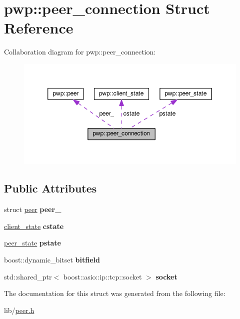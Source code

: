 \hypertarget{structpwp_1_1peer__connection}{}\section{pwp\+:\+:peer\+\_\+connection Struct Reference}
\label{structpwp_1_1peer__connection}


Collaboration diagram for pwp\+:\+:peer\+\_\+connection\+:\nopagebreak
\begin{figure}[H]
\begin{center}
\leavevmode
\includegraphics[width=350pt]{structpwp_1_1peer__connection__coll__graph}
\end{center}
\end{figure}
\subsection*{Public Attributes}
\begin{DoxyCompactItemize}
\item 
\mbox{\label{structpwp_1_1peer__connection_a467a52a32ff0250d977b69026edce52c}} 
struct \hyperlink{structpwp_1_1peer}{peer} {\bfseries peer\+\_\+}
\item 
\mbox{\label{structpwp_1_1peer__connection_a7760fde637e5b09ba43010b8e5b4cdf0}} 
\hyperlink{structpwp_1_1client__state}{client\+\_\+state} {\bfseries cstate}
\item 
\mbox{\label{structpwp_1_1peer__connection_a6720cb5711a2f21d8025e45a9de05a85}} 
\hyperlink{structpwp_1_1peer__state}{peer\+\_\+state} {\bfseries pstate}
\item 
\mbox{\label{structpwp_1_1peer__connection_a61d97fcac3bd21d477a1204a3803a639}} 
boost\+::dynamic\+\_\+bitset {\bfseries bitfield}
\item 
\mbox{\label{structpwp_1_1peer__connection_a20b428bd7fb2d3de54016c8801cb98b8}} 
std\+::shared\+\_\+ptr$<$ boost\+::asio\+::ip\+::tcp\+::socket $>$ {\bfseries socket}
\end{DoxyCompactItemize}


The documentation for this struct was generated from the following file\+:\begin{DoxyCompactItemize}
\item 
lib/\hyperlink{peer_8h}{peer.\+h}\end{DoxyCompactItemize}
